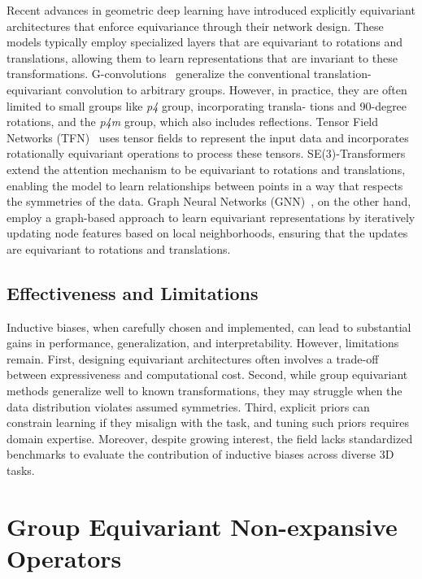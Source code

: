 Recent advances in geometric deep learning have introduced explicitly
equivariant architectures that enforce equivariance through their network
design.
%
These models typically employ specialized layers that are equivariant to
rotations and translations, allowing them to learn representations that are
invariant to these transformations.
%
G-convolutions~\cite{cohen2016group} generalize the conventional
translation-equivariant convolution to arbitrary groups. However, in practice,
they are often limited to small groups like \textit{p4} group, incorporating
transla- tions and 90-degree rotations, and the \textit{p4m} group, which also
includes reflections.
%
Tensor Field Networks (TFN)~\cite{thomas2018tensor} uses tensor fields to
represent the input data and incorporates rotationally equivariant operations
to process these tensors.
%
SE(3)-Transformers~\cite{fuchs2020se} extend the attention mechanism to be
equivariant to rotations and translations, enabling the model to learn
relationships between points in a way that respects the symmetries of the data.
%
Graph Neural Networks (GNN)~\cite{satorras2021n}, on the other hand, employ a
graph-based approach to learn equivariant representations by iteratively
updating node features based on local neighborhoods, ensuring that the updates
are equivariant to rotations and translations.

\subsection{Effectiveness and Limitations}
Inductive biases, when carefully chosen and implemented, can lead to
substantial gains in performance, generalization, and interpretability.
%
However, limitations remain. First, designing equivariant architectures often
involves a trade-off between expressiveness and computational cost. Second,
while group equivariant methods generalize well to known transformations, they
may struggle when the data distribution violates assumed symmetries. Third,
explicit priors can constrain learning if they misalign with the task, and
tuning such priors requires domain expertise.
%
Moreover, despite growing interest, the field lacks standardized benchmarks to
evaluate the contribution of inductive biases across diverse 3D tasks.

\section{Group Equivariant Non-expansive Operators}\label{sec:geneos}

